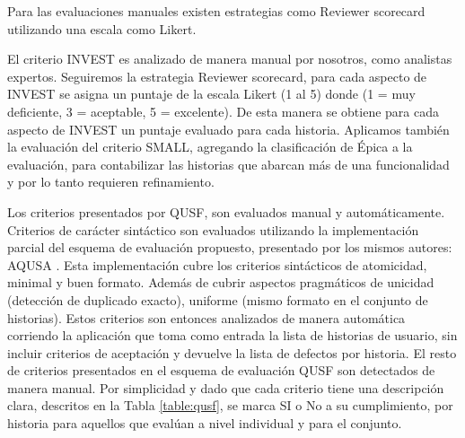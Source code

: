 Para las evaluaciones manuales existen estrategias como Reviewer scorecard utilizando una escala como Likert.

El criterio INVEST es analizado de manera manual por nosotros, como analistas expertos. Seguiremos la estrategia Reviewer scorecard, para cada aspecto de INVEST se asigna un puntaje de la escala Likert (1 al 5) donde (1 = muy deficiente, 3 = aceptable, 5 = excelente). De esta manera se obtiene para cada aspecto de INVEST un puntaje evaluado para cada historia.
Aplicamos también la evaluación del criterio SMALL, agregando la clasificación de Épica a la evaluación, para contabilizar las historias que abarcan más de una funcionalidad y por lo tanto requieren refinamiento.

Los criterios presentados por QUSF, son evaluados manual y automáticamente. Criterios de carácter sintáctico son evaluados utilizando la implementación parcial del esquema de evaluación propuesto, presentado por los mismos autores: AQUSA \cite{aqusa}.
Esta implementación cubre los criterios sintácticos de atomicidad, minimal y buen formato. Además de cubrir aspectos pragmáticos de unicidad (detección de duplicado exacto), uniforme (mismo formato en el conjunto de historias).
Estos criterios son entonces analizados de manera automática corriendo la aplicación que toma como entrada la lista de historias de usuario, sin incluir criterios de aceptación y devuelve la lista de defectos por historia.
El resto de criterios presentados en el esquema de evaluación QUSF son detectados de manera manual. Por simplicidad y dado que cada criterio tiene una descripción clara, descritos en la Tabla \ref{table:qusf}, se marca SI o No a su cumplimiento, por historia para aquellos que evalúan a nivel individual y para el conjunto.

